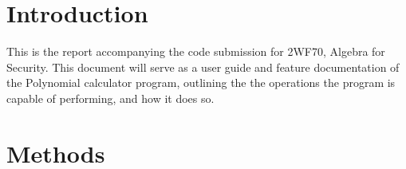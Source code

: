 \documentclass[
10pt, %
a4paper, %
oneside, %
headinclude,footinclude, %
BCOR5mm, %
]{scrartcl}
\begin{document}

\section{Introduction}

This is the report accompanying the code submission for 2WF70, Algebra for Security. This document will serve as a user guide and feature documentation of the Polynomial calculator program, outlining the the operations the program is capable of performing, and how it does so.

 

\section{Methods}
\end{document}
